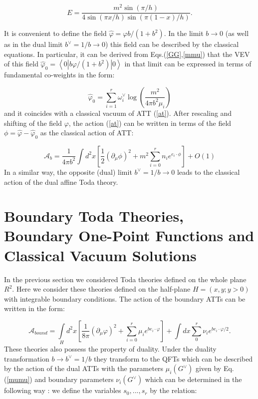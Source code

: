 \documentclass[a4paper,12pt,titlepage,final]{article}
\begin{document}
\begin{equation}
E=\frac{m^{2}\sin (\pi /h)}{4\sin (\pi x/h)\sin (\pi (1-x)/h)}. 
\label{BCBC}
\end{equation}

It is convenient to define the field $\widehat{\varphi }=\varphi
b/(1+b^{2})$.
In the limit $b\rightarrow 0$ (as well as in the dual limit $b^{\vee
}=1/b\rightarrow 0$) this field can be described by the classical equations.
In particular, it can be derived from Eqs.(\ref{GG},\ref{mmu}) that the VEV
of this field $\widehat{\varphi }_{0}=\left\langle 0|b\varphi
/(1+b^{2})|0\right\rangle $ in that limit can be expressed in terms of
fundamental co-weights in the form:

\begin{equation}
\widehat{\varphi }_{0}=\sum_{i=1}^{r}\omega _{i}^{\vee }
\log \left( \frac{m^{2}}{4\pi b^{2}\mu _{i}}\right)  \label{vcl}
\end{equation}
and it coincides with a classical vacuum of ATT (\ref{at}). After
rescaling and
shifting of the field $\varphi$, the action (\ref{at}) can be written in
terms of the field $\phi =\widehat{\varphi }-\widehat{\varphi }_{0}$ as the
classical action of ATT:

\begin{equation}
\mathcal{A}_{b}=\frac{1}{4\pi b^{2}}\int d^{2}x[\frac{1}{2}(\partial _{\mu
}\phi )^{2}+m^{2}\sum_{i=0}^{r}n_{i}e^{e_{i}\cdot \phi }]+O(1)  \label{ACL}
\end{equation}
In a similar way, the opposite (dual) limit $b^{\vee }=1/b\rightarrow
0$ leads to the classical action of the dual affine Toda theory.

\section{Boundary Toda Theories, Boundary One-Point Functions and Classical
Vacuum Solutions}

In the previous section we considered Toda theories defined on the whole
plane $R^{2}$. Here we consider these theories defined
on the half-plane $H=(x,y;y>0)$ with integrable boundary conditions.
The action of the boundary
ATTs can be written in the form:

\begin{equation}
\mathcal{A}_{bound}=\int\limits_{H}d^{2}x\left[ \frac{1}{8\pi }(\partial
_{\mu }\varphi )^{2}+\sum_{i=0}^{r}\mu _{i}e^{be_{i}\cdot \varphi }\right]
+\int dx\sum\limits_{0}^{r}\nu _{i}e^{be_{i}\cdot \varphi /2}.  \label{atb}
\end{equation}
These theories also possess the property of duality. Under the duality
transformation $b\rightarrow b^{\vee }=1/b$ they transform to the QFTs which
can be described by the action of the dual ATTs with the parameters $\mu
_{i}(G^{\vee })$ given by Eq.(\ref{mumu}) and boundary parameters $\nu
_{i}(G^{\vee })$ which can be determined in the following way \cite{FZZA}:
we define the variables $s_{0},...,s_{r}$ by the relation:
\end{document}
